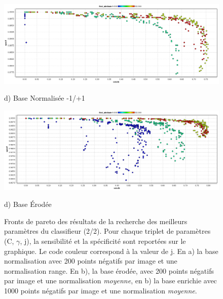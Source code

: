 \begin{figure}[h!]
\label{fig:paretoParams2}
\begin{center}

\includegraphics[width=14cm]{images/pareto_param_range.png}

{\small d) Base Normalisée -1/+1}

\vspace{0.5cm}

\includegraphics[width=14cm]{images/pareto_param_erosion.png}

{\small d) Base \'Erodée}


\end{center}
 \caption{Fronts de pareto des résultats de la recherche des meilleurs paramètres du classifieur (2/2). Pour chaque triplet de paramètres (C, $\gamma$, j), la sensibilité et la spécificité sont reportées sur le graphique. Le code couleur correspond à la valeur de j. En a) la base normalisation avec 200 points négatifs par image et une normalisation range. En b), la base érodée, avec 200 points négatifs par image et une normalisation \emph{moyenne}, en b) la base enrichie avec 1000 points négatifs par image et une normalisation \emph{moyenne}. }
\end{figure}





